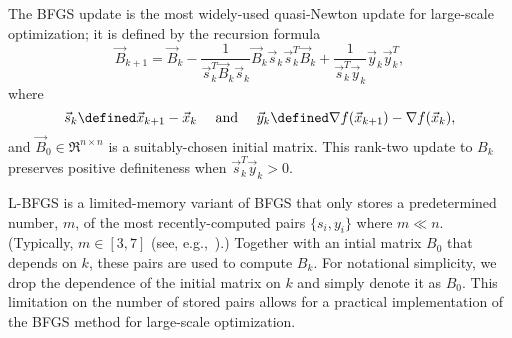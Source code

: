 The {\small BFGS} update is the most widely-used quasi-Newton update for large-scale optimization;
it is defined by the recursion formula 
\begin{equation}
	\label{eq:recursion}
  \vec{B}_{k+1} = \vec{B}_{k} -
\frac{1 }{\vec{s}^T_{k}\vec{B}_{k}\vec{s}_{k}}\vec{B}_{k}\vec{s}_{k}
\vec{s}_{k}^T\vec{B}_{k}+
\frac{1}{\vec{s}^T_{k}\vec{y}_{k}} \vec{y}_{k}\vec{y}^T_{k},
\end{equation}
where
\begin{equation}\label{eqn-sy}
	\vec{s}_{k} \defined \vec{x}_{k+1} - \vec{x}_{k} \quad \text{ and } \quad \vec{y}_{k} \defined \nabla f(\vec{x}_{k+1}) - \nabla f(\vec{x}_{k}),
\end{equation}
and $ \vec{B}_0 \in \Re^{n \times n} $ is a suitably-chosen
initial matrix.
This rank-two update to $B_{k}$ preserves positive definiteness when $
\vec{s}^T_{k}\vec{y}_{k} > 0$.

{\small L-BFGS} is a limited-memory variant of {\small BFGS} that only
stores a predetermined number, $m$, of the most recently-computed pairs $\{s_i,y_i\}$
where $m\ll n$. (Typically, $m\in[3,7]$ (see, e.g.,~\cite{ByrNS94}).)  Together with an intial matrix $B_0$ that depends on $k$, 
these pairs are used to compute $B_k$.  For notational simplicity, we drop the
dependence of the initial matrix on $k$ and simply denote it as $B_0$.
 This limitation on the number of stored pairs
allows for a practical implementation of the {\small BFGS} method
for large-scale optimization.


